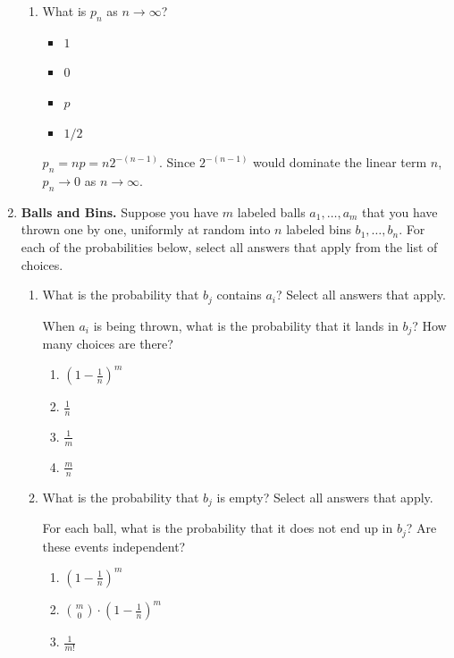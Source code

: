 \documentclass[11pt, preview]{standalone} %
\begin{document}
\begin{enumerate}
\begin{enumerate}
\item What is $p_n$ as $n \rightarrow \infty$? 
\begin{Choices}
\begin{itemize}
\FalseChoice\item $1$
\TrueChoice\item $0$   
\FalseChoice\item $p$
\FalseChoice\item $1/2$
\end{itemize}
\Solution $p_n = np = n2^{-(n-1)}$. Since $2^{-(n-1)}$ would dominate the linear term $n$, $p_n \rightarrow 0$ as $n \rightarrow \infty$. 
\end{Choices}
\end{enumerate}
\item {\bf Balls and Bins.} Suppose you have $m$ labeled balls $a_1, \ldots, a_m$ that you have thrown one by one, uniformly at random into $n$ labeled bins $b_1, \ldots, b_n$. For each of the probabilities below, select all answers that apply from the list of choices.
\begin{enumerate}
\item What is the probability that $b_j$ contains $a_i$? Select all answers that apply.
\begin{Multi}
When $a_i$ is being thrown, what is the probability that it lands in $b_j$? How many choices are there?
\begin{enumerate}
\FalseChoice\item $\left(1 -\frac{1}{n}\right)^m$
\TrueChoice\item $\frac{1}{n}$
\FalseChoice\item $\frac{1}{m}$
\FalseChoice\item $\frac{m}{n}$
\end{enumerate}
\end{Multi}
\item What is the probability that $b_j$ is empty? Select all answers that apply.
\begin{Multi}
For each ball, what is the probability that it does not end up in $b_j$? Are these events independent?
\begin{enumerate}
\TrueChoice\item $\left(1 -\frac{1}{n}\right)^m$
\TrueChoice\item $\binom{m}{0}\cdot\left(1 -\frac{1}{n}\right)^m$
\FalseChoice\item $\frac{1}{m!}$

\end{enumerate}
\end{Multi}
\end{enumerate}
\end{enumerate}
\end{document}
